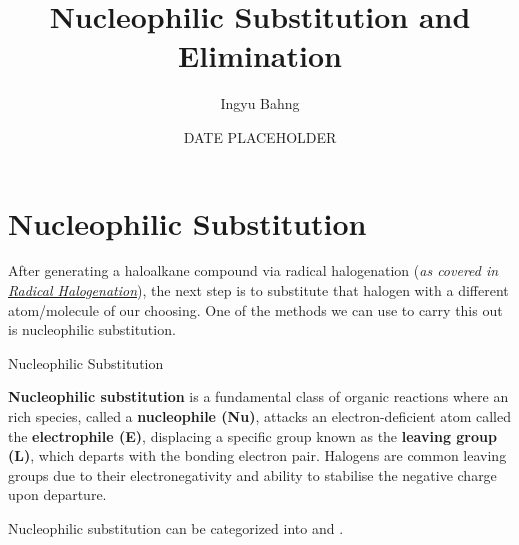 \documentclass[10pt]{article}
\title{Nucleophilic Substitution and Elimination}
\date{DATE PLACEHOLDER}
\author{Ingyu Bahng}
\begin{document}


\section{Nucleophilic Substitution}

  After generating a haloalkane compound via radical halogenation (\textit{as covered in \href{../radical_halogenation/radical_halogenation.pdf}{Radical Halogenation}}), the next step is to substitute that halogen with a different atom/molecule of our choosing. One of the methods we can use to carry this out is nucleophilic substitution.

  \begin{core}{Nucleophilic Substitution}
   
    \textbf{Nucleophilic substitution} is a fundamental class of organic reactions where an  rich species, called a \textbf{nucleophile (Nu)}, attacks an electron-deficient atom called the \textbf{electrophile (E)}, displacing a specific group known as the \textbf{leaving group (L)}, which departs with the bonding electron pair. Halogens are common leaving groups due to their electronegativity and ability to stabilise the negative charge upon departure.

  \end{core}

  Nucleophilic substitution can be categorized into \snt and \sno.
\end{document}
